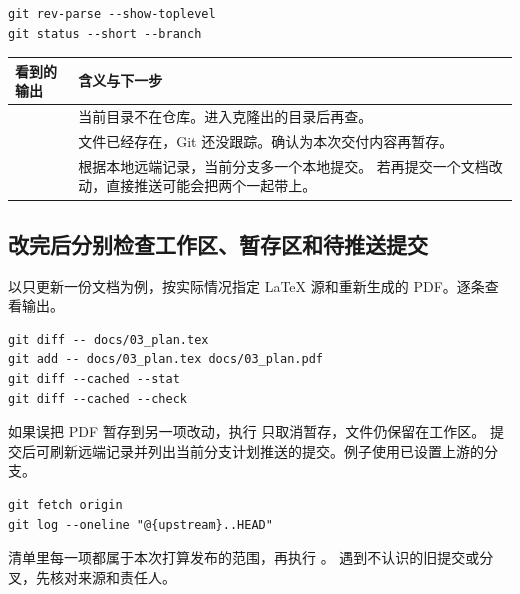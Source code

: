 \documentclass[UTF8,11pt,a4paper]{ctexart}
\begin{document}
\begin{lstlisting}
git rev-parse --show-toplevel
git status --short --branch
\end{lstlisting}

\begin{center}\small
\begin{tabularx}{\linewidth}{@{}L{4.35cm}Y@{}}
\toprule
看到的输出 & 含义与下一步 \\
\midrule
{} & 当前目录不在仓库。进入克隆出的目录后再查。 \\
 & 文件已经存在，Git 还没跟踪。确认为本次交付内容再暂存。 \\
 & 根据本地远端记录，当前分支多一个本地提交。
若再提交一个文档改动，直接推送可能会把两个一起带上。 \\
\bottomrule
\end{tabularx}
\end{center}

\subsection{改完后分别检查工作区、暂存区和待推送提交}

以只更新一份文档为例，按实际情况指定 LaTeX 源和重新生成的 PDF。逐条查看输出。

\begin{lstlisting}
git diff -- docs/03_plan.tex
git add -- docs/03_plan.tex docs/03_plan.pdf
git diff --cached --stat
git diff --cached --check
\end{lstlisting}

如果误把 PDF 暂存到另一项改动，执行
 只取消暂存，文件仍保留在工作区。
提交后可刷新远端记录并列出当前分支计划推送的提交。例子使用已设置上游的分支。

\begin{lstlisting}
git fetch origin
git log --oneline "@{upstream}..HEAD"
\end{lstlisting}

\noindent 清单里每一项都属于本次打算发布的范围，再执行 。
遇到不认识的旧提交或分叉，先核对来源和责任人。
\end{document}
